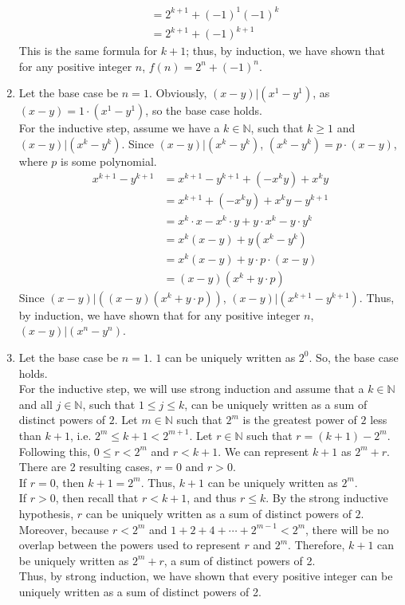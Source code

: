 \documentclass{article}
\begin{document}
\begin{enumerate}[label=\textbf{\arabic*}.]
\begin{align*}
        &=2^{k+1}+(-1)^1(-1)^{k}\\
        &=2^{k+1}+(-1)^{k+1}
    \end{align*}
    This is the same formula for $k+1$; thus, by induction, we have shown that for any positive integer $n$, $f(n)=2^n+(-1)^n$.
    \item Let the base case be $n=1$. Obviously, $(x-y)|(x^1-y^1)$, as $(x-y)=1\cdot(x^1-y^1)$, so the base case holds.\\
    For the inductive step, assume we have a $k\in\mathbb{N}$, such that $k\geq1$ and $(x-y)|(x^k-y^k)$. Since $(x-y)|(x^k-y^k)$, $(x^k-y^k)=p\cdot(x-y)$, where $p$ is some polynomial.
    \begin{align*}
        x^{k+1}-y^{k+1}&=x^{k+1}-y^{k+1}+(-x^ky)+x^ky\\
        &=x^{k+1}+(-x^ky)+x^ky-y^{k+1}\\
        &=x^{k}\cdot x-x^k\cdot y+y\cdot x^k-y\cdot y^{k}\\
        &=x^{k}(x-y)+y(x^k-y^{k})\\
        &=x^{k}(x-y)+y\cdot p\cdot(x-y)\\
        &=(x-y)(x^{k}+y\cdot p)
    \end{align*}
    Since $(x-y)|((x-y)(x^{k}+y\cdot p))$, $(x-y)|(x^{k+1}-y^{k+1})$. Thus, by induction, we have shown that for any positive integer $n$, $(x-y)|(x^n-y^n)$.
    \item Let the base case be $n=1$. $1$ can be uniquely written as $2^0$. So, the base case holds.\\
    For the inductive step, we will use strong induction and assume that a $k\in\mathbb{N}$ and all $j\in\mathbb{N}$, such that $1\leq j\leq k$, can be uniquely written as a sum of distinct powers of $2$. Let $m\in\mathbb{N}$ such that $2^m$ is the greatest power of $2$ less than $k+1$, i.e. $2^m\leq k+1 <2^{m+1}$. Let $r\in\mathbb{N}$ such that $r=(k+1)-2^m$. Following this, $0\leq r<2^m$ and $r<k+1$. We can represent $k+1$ as $2^m+r$. There are 2 resulting cases, $r=0$ and $r>0$.\\
     If $r=0$, then $k+1=2^m$. Thus, $k+1$ can be uniquely written as $2^m$.\\
     If $r>0$, then recall that $r<k+1$, and thus $r\leq k$. By the strong inductive hypothesis, $r$ can be uniquely written as a sum of distinct powers of $2$. Moreover, because $r<2^m$ and $1+2+4+\cdots+2^{m-1}<2^{m}$, there will be no overlap between the powers used to represent $r$ and $2^m$. Therefore, $k+1$ can be uniquely written as $2^m+r$, a sum of distinct powers of 2.\\
    Thus, by strong induction, we have shown that every positive integer can be uniquely written as a sum of distinct powers of 2.
\end{enumerate}
\end{document}
